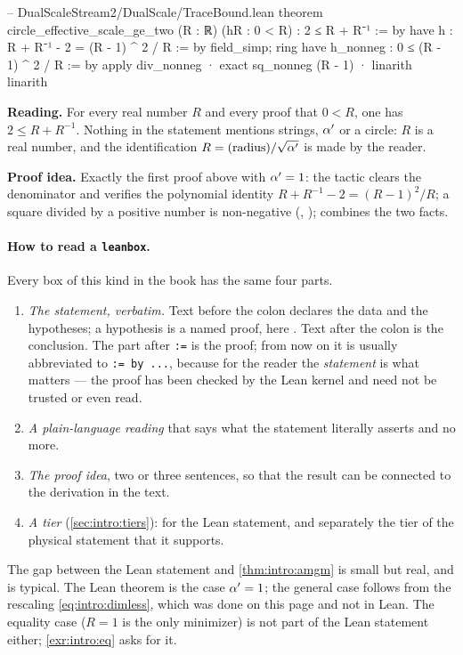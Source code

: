 \begin{leanbox}
\begin{leancode}
-- DualScaleStream2/DualScale/TraceBound.lean
theorem circle_effective_scale_ge_two (R : ℝ) (hR : 0 < R) :
    2 ≤ R + R⁻¹ := by
  have h : R + R⁻¹ - 2 = (R - 1) ^ 2 / R := by field_simp; ring
  have h_nonneg : 0 ≤ (R - 1) ^ 2 / R := by
    apply div_nonneg
    · exact sq_nonneg (R - 1)
    · linarith
  linarith
\end{leancode}
\textbf{Reading.} For every real number $R$ and every proof  that $0<R$, one has
$2\le R+R^{-1}$. Nothing in the statement mentions strings, $\alpha'$ or a circle: $R$ is a real
number, and the identification $R=(\text{radius})/\sqrt{\alpha'}$ is made by the reader.

\textbf{Proof idea.} Exactly the first proof above with $\alpha'=1$: the tactic 
clears the denominator and  verifies the polynomial identity
$R+R^{-1}-2=(R-1)^2/R$; a square divided by a positive number is non-negative
(, );  combines the two facts.
\end{leanbox}

\paragraph{How to read a \texttt{leanbox}.} Every box of this kind in the book has the same
four parts.
\begin{enumerate}[leftmargin=*,itemsep=2pt]
\item \emph{The statement, verbatim.} Text before the colon declares the data and the
hypotheses; a hypothesis is a named proof, here . Text after the colon is
the conclusion. The part after \texttt{:=} is the proof; from now on it is usually abbreviated
to \texttt{:= by ...}, because for the reader the \emph{statement} is what matters --- the
proof has been checked by the Lean kernel and need not be trusted or even read.
\item \emph{A plain-language reading} that says what the statement literally asserts and no
more.
\item \emph{The proof idea}, two or three sentences, so that the result can be connected to
the derivation in the text.
\item \emph{A tier} (\cref{sec:intro:tiers}): \TA{} for the Lean statement, and separately the
tier of the physical statement that it supports.
\end{enumerate}
The gap between the Lean statement and \cref{thm:intro:amgm} is small but real, and is typical.
The Lean theorem is the case $\alpha'=1$; the general case follows from the rescaling
\eqref{eq:intro:dimless}, which was done on this page and not in Lean. The equality case
($R=1$ is the only minimizer) is not part of the Lean statement either; \cref{exr:intro:eq}
asks for it.

